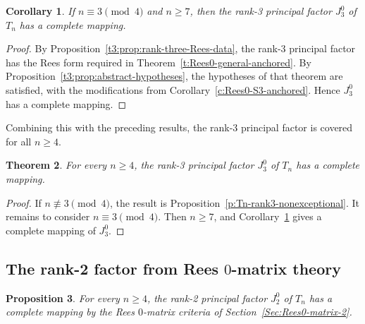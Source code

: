 \documentclass[11pt]{article}
\theoremstyle{plain}
\newtheorem{theorem}{Theorem}[section]
\newtheorem{prop}[theorem]{Proposition}
\newtheorem{cor}[theorem]{Corollary}
\theoremstyle{remark}
\theoremstyle{definition}
\theoremstyle{plain}
\begin{document}
\begin{cor}\label{t3:thm:right-half}
If $n\equiv3\pmod4$ and $n\ge7$, then the rank-3 principal factor $J_3^0$
of $T_n$ has a complete mapping.
\end{cor}

\begin{proof}
By Proposition~\ref{t3:prop:rank-three-Rees-data}, the rank-3 principal
factor has the Rees form required in Theorem~\ref{t:Rees0-general-anchored}.
By Proposition~\ref{t3:prop:abstract-hypotheses}, the hypotheses of that theorem
are satisfied, with the modifications from Corollary~\ref{c:Rees0-S3-anchored}. Hence $J_3^0$ has a complete mapping.
\end{proof}

Combining this with the preceding results, the rank-3 principal factor is covered for all $n\ge4$.
\begin{theorem}\label{t3:thm:main}
For every $n\ge4$, the rank-3 principal factor $J_3^0$ of $T_n$ has a
complete mapping.
\end{theorem}

\begin{proof}
If $n\not\equiv3\pmod4$, the result is Proposition~\ref{p:Tn-rank3-nonexceptional}.
It remains to consider $n\equiv3\pmod4$. Then $n\ge7$, and
Corollary~\ref{t3:thm:right-half} gives a complete mapping of $J_3^0$.
\end{proof}

\subsection[The rank-2 factor from Rees 0-matrix theory]{The rank-2 factor from Rees $0$-matrix theory}
\label{Sec:Tn-rank-two-Rees-observation}

\begin{prop}\label{p:Tn-rank-two-indirect}
For every $n\ge4$, the rank-2 principal factor $J_2^0$ of $T_n$ has a
complete mapping by the Rees $0$-matrix criteria of
Section~\ref{Sec:Rees0-matrix-2}.
\end{prop}
\end{document}
